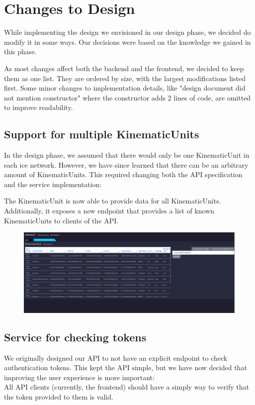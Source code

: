 \chapter{Changes to Design} \label{design-changes}

While implementing the design we envisioned in our design phase, we decided do modify it in some ways.
Our decisions were based on the knowledge we gained in this phase.

As most changes affect both the \gls{backend} and the \gls{frontend}, we decided to keep them as one list.
They are ordered by size, with the largest modifications listed first.
Some minor changes to implementation details, like "design document did not mention constructor" where the constructor adds 2 lines of code, are omitted to improve readability.

\section{Support for multiple KinematicUnits}

In the design phase, we assumed that there would only be one KinematicUnit in each \gls{ice} network.
However, we have since learned that there can be an arbitrary amount of KinematicUnits.
This required changing both the API specification and the service implementation:

The KinematicUnit is now able to provide data for all KinematicUnits. 
Additionally, it exposes a new endpoint that provides a list of known KinematicUnits to clients of the API.

\begin{figure}[h!]
    \centering
    \includegraphics[width=0.8\linewidth]{images/kinematic.png}
\end{figure}

\section{Service for checking tokens}

We originally designed our API to not have an explicit endpoint to check authentication tokens.
This kept the API simple, but we have now decided that improving the user experience is more important:\\
All API clients (currently, the \gls{frontend}) should have a simply way to verify that the token provided to them is valid.

